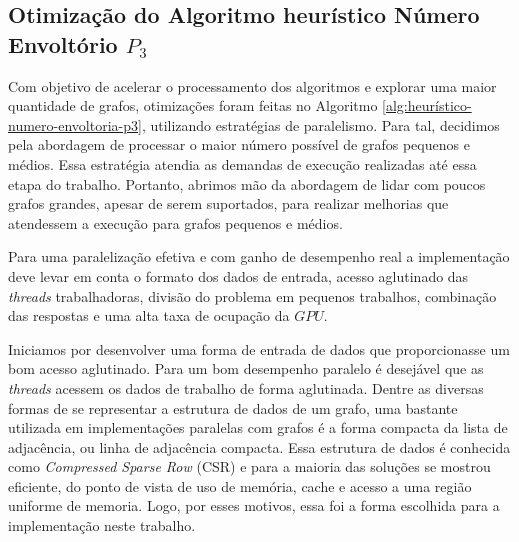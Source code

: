 \subsection{Otimização do Algoritmo heurístico Número Envoltório $P_3$}

Com objetivo de acelerar o processamento dos algoritmos e explorar uma maior quantidade de grafos, otimizações foram feitas no Algoritmo \ref{alg:heurístico-numero-envoltoria-p3}, utilizando estratégias de paralelismo.
Para tal, decidimos pela abordagem de processar o maior número possível de grafos pequenos e médios. Essa estratégia atendia as demandas de execução realizadas até essa etapa do trabalho. Portanto, abrimos mão da abordagem de lidar com poucos grafos grandes, apesar de serem suportados, para realizar melhorias que atendessem a execução para grafos pequenos e médios.

Para uma paralelização efetiva e com ganho de desempenho real a implementação deve levar em conta o formato dos dados de entrada, acesso aglutinado das \textit{threads} trabalhadoras, divisão do problema em pequenos trabalhos, combinação das respostas e uma alta taxa de ocupação da $GPU$.

Iniciamos por desenvolver uma forma de entrada de dados que proporcionasse um bom acesso aglutinado. Para um bom desempenho paralelo é desejável que as \textit{threads} acessem os dados de trabalho de forma aglutinada. Dentre as diversas formas de se representar a estrutura de dados de um grafo, uma bastante utilizada em implementações paralelas com grafos é a forma compacta da lista de adjacência,
ou linha de adjacência compacta. Essa estrutura de dados é conhecida como \textit{Compressed Sparse Row} (CSR)\cite{Reviewed2009,Fu2014,Merrill2012,Wang2015} e para a maioria das soluções se mostrou eficiente, do ponto de vista de uso de memória, cache e acesso a uma região uniforme de memoria. Logo, por esses motivos, essa foi a forma escolhida para a implementação neste trabalho.

